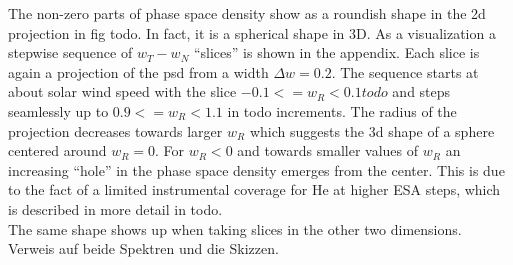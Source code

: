 The non-zero parts of phase space density show as a roundish shape in the 2d projection in fig todo. In fact, it is a spherical shape in 3D. As a visualization a stepwise sequence of $w_T - w_N$ ``slices'' is shown in the appendix. Each slice is again a projection of the psd from a width $\Delta w = 0.2$. The sequence starts at about solar wind speed with the slice $-0.1 <= w_R < 0.1 todo$ and steps seamlessly up to $0.9 <= w_R < 1.1$ in todo increments. The radius of the projection decreases towards larger $w_R$ which suggests the 3d shape of a sphere centered around $w_R = 0$.
For $w_R < 0$ and towards smaller values of $w_R$ an increasing ``hole'' in the phase space density emerges from the center. This is due to the fact of a limited instrumental coverage for He at higher ESA steps, which is described in more detail in todo.\\ The same shape shows up when taking slices in the other two dimensions. Verweis auf beide Spektren und die Skizzen.\\

